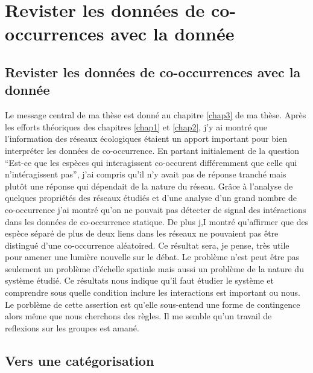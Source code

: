 \section*{Revister les données de co-occurrences avec la
donnée}\label{revister-les-donnuxe9es-de-co-occurrences-avec-la-donnuxe9e}

\subsection*{Revister les données de co-occurrences avec la
donnée}\label{revister-les-donnuxe9es-de-co-occurrences-avec-la-donnuxe9e-1}

Le message central de ma thèse est donné au chapitre \ref{chap3} de ma
thèse. Après les efforts théoriques des chapitres \ref{chap1} et
\ref{chap2}, j'y ai montré que l'information des réseaux écologiques
étaient un apport important pour bien interpréter les données de
co-occurrence. En partant initialement de la question ``Est-ce que les
espèces qui interagissent co-occurent différemment que celle qui
n'intéragissent pas'', j'ai compris qu'il n'y avait pas de réponse
tranché mais plutôt une réponse qui dépendait de la nature du réseau.
Grâce à l'analyse de quelques propriétés des réseaux étudiés et d'une
analyse d'un grand nombre de co-occurrence j'ai montré qu'on ne pouvait
pas détecter de signal des intéractions dans les données de
co-occurrence statique. De plus j,I montré qu'affirmer que des espèce
séparé de plus de deux liens dans les réseaux ne pouvaient pas être
distingué d'une co-occurrence aléatoired. Ce résultat sera, je pense,
très utile pour amener une lumière nouvelle sur le débat. Le problème
n'est peut être pas seulement un problème d'échelle spatiale
\citep{Araujo2014, Belmaker2015} mais aussi un problème de la nature du
système étudié. Ce résultats nous indique qu'il faut étudier le système
et comprendre sous quelle condition inclure les interactions est
important ou nous. Le porblème de cette assertion est qu'elle
sous-entend une forme de contingence alors même que nous cherchons des
règles. Il me semble qu'un travail de reflexions sur les groupes est
amané.

\subsection*{Vers une catégorisation}\label{vers-une-catuxe9gorisation}

